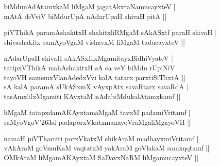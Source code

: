 \begin{entry}
\smallskip
\begin{shl}
biMdunAdAtamxkaM liMgaM jagatAkxraNamucayxteV |\\
mAtA deVviV biMdurUpA nAdarUpaH shivaH pitA ||
\end{shl}
\smallskip
{}
\smallskip
\begin{shl}
piVThikA paramAshakitxH shakitxliRMgaM sAkASxtf paraH shivaH |\\
shivashakitx samAyoVgaM vishavxM liMgaM taducayxteV ||
\end{shl}
\smallskip
{}
\smallskip
\begin{shl}
nAdarUpaH shivaH sAkASxlilxMgamitayxBidhiVyateV |\\
tatipxVThikA mahAshakitxH sA ca veY biMdu rUpiNiV |\\
tayoVH samemxVlanAdedxVvi kalA tatarx parxtiSiThxtA ||\\
sA kalA paramA sUkASxmX vAyxpAtx savaRtarx savaRdA |\\
tasAmxlilxMgamiti KAyxtaM nAdabiMdukalAtamxkamf ||
\end{shl}
\smallskip
{}
\smallskip
{}
\smallskip
\begin{shl}
liMgaM tatapxdamAKAyxtamaMgaM tavxM padamiVritamf |\\
saMyoVgoV{\char'263}si padaporxVkatxmanayoVraMgaliMgayoVH ||
\end{shl}
\smallskip
{}
\smallskip
{}
\smallskip
\begin{shl}
namaH piVThamiti porxVkatxM shikAraM madhayxmiVritamf |\\
vAkAraM goVmuKaM vaqtatxM yakAraM goVlakaM samxqqtamf ||\\
OMkAraM liMgamAKAyxtaM SaDavxNaRM liMgamucayxteV ||
\end{shl}
\smallskip
{}
\end{entry}
